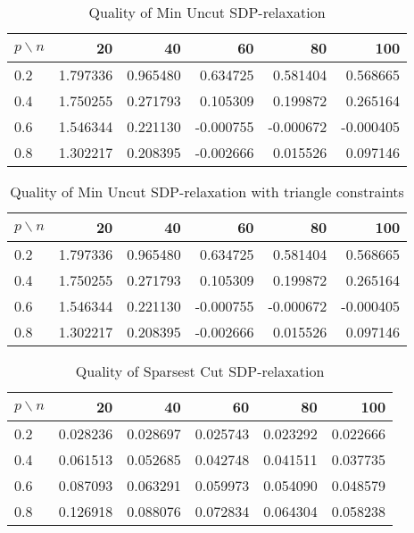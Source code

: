 \documentclass[12pt]{article}
\begin{document}
\begin{table}[H]
	\centering
	\begin{tabular}{|lrrrrr|}
		\toprule
		{$p \backslash n$} &       20  &       40  &       60  &       80  &       100 \\
		\midrule
		0.2 &  1.797336 &  0.965480 &  0.634725 &  0.581404 &  0.568665 \\
		0.4 &  1.750255 &  0.271793 &  0.105309 &  0.199872 &  0.265164 \\
		0.6 &  1.546344 &  0.221130 & -0.000755 & -0.000672 & -0.000405 \\
		0.8 &  1.302217 &  0.208395 & -0.002666 &  0.015526 &  0.097146 \\
		\bottomrule
	\end{tabular}
	\caption{Quality of Min Uncut SDP-relaxation}
\end{table}

\begin{table}[H]
	\centering
	\begin{tabular}{|lrrrrr|}
		\toprule
		{$p \backslash n$} &       20  &       40  &       60  &       80  &       100 \\
		\midrule
		0.2 &  1.797336 &  0.965480 &  0.634725 &  0.581404 &  0.568665 \\
		0.4 &  1.750255 &  0.271793 &  0.105309 &  0.199872 &  0.265164 \\
		0.6 &  1.546344 &  0.221130 & -0.000755 & -0.000672 & -0.000405 \\
		0.8 &  1.302217 &  0.208395 & -0.002666 &  0.015526 &  0.097146 \\
		\bottomrule
	\end{tabular}
	\caption{Quality of Min Uncut SDP-relaxation with triangle constraints}
\end{table}

\begin{table}[H]
	\centering
	\begin{tabular}{|lrrrrr|}
		\toprule
		{$p \backslash n$} &       20  &       40  &       60  &       80  &       100 \\
		\midrule
		0.2 &  0.028236 &  0.028697 &  0.025743 &  0.023292 &  0.022666 \\
		0.4 &  0.061513 &  0.052685 &  0.042748 &  0.041511 &  0.037735 \\
		0.6 &  0.087093 &  0.063291 &  0.059973 &  0.054090 &  0.048579 \\
		0.8 &  0.126918 &  0.088076 &  0.072834 &  0.064304 &  0.058238 \\
		\bottomrule
	\end{tabular}
	\caption{Quality of Sparsest Cut SDP-relaxation}
\end{table}
\end{document}
